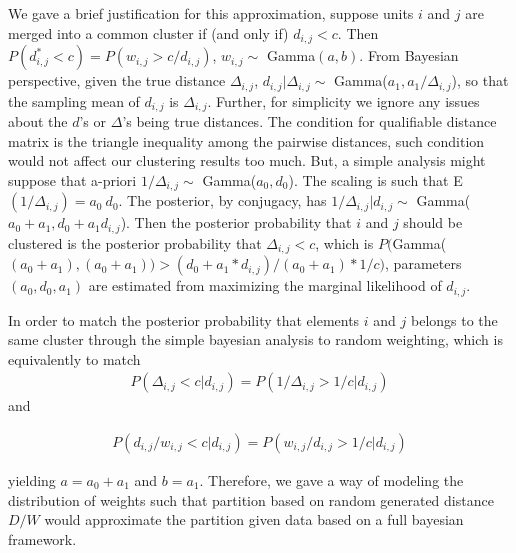 \documentclass[aoas,preprint]{imsart}
\begin{document}
We gave a brief justification for this approximation, suppose units $i$ and $j$ are merged into a common cluster if (and only if) $d_{i,j} < c$. Then $P(d^*_{i,j} < c) = P(w_{i,j} > c / d_{i,j})$, $w_{i,j} \sim$ Gamma$(a, b)$. From Bayesian perspective, given the true distance $\Delta_{i,j}$, $d_{i,j} | \Delta_{i,j} \sim$ Gamma($a_1, a_1 / \Delta_{i,j}$), so that the sampling mean of $d_{i,j}$ is $\Delta_{i,j}$.  Further, for simplicity we ignore any issues about the $d$'s or $\Delta$'s being true distances. The condition for qualifiable distance matrix is the triangle inequality among the pairwise distances, such condition would not affect our clustering results too much. But, a simple analysis might suppose that a-priori $1 / \Delta_{i,j} \sim$ Gamma($a_0, d_0$). The scaling is such that E$(1 / \Delta_{i,j}) = a_0 \ d_0$. The posterior, by conjugacy, has $1 / \Delta_{i,j} | d_{i,j} \sim$ Gamma($a_0 + a_1, d_0 + a_1d_{i,j}$). Then the posterior probability that $i$ and $j$ should be clustered is the posterior probability that $\Delta_{i,j} < c$, which is $P($Gamma($(a_0 + a_1),(a_0 + a_1)) > (d_0 + a_1 * d_{i,j}) / (a_0 + a_1) * 1/c )$, parameters $(a_0, d_0, a_1)$ are estimated from maximizing the marginal likelihood of $d_{i,j}$.

In order to match the posterior probability that elements $i$ and $j$ belongs to the same cluster through the simple bayesian analysis to random weighting, which is equivalently to match 
\begin{eqnarray*} 
P(\Delta_{i,j} < c | d_{i,j}) = P( 1 /  \Delta_{i,j} > 1 / c | d_{i,j})
\end{eqnarray*}
and 

\begin{eqnarray*}
P(d_{i,j} / w_{i,j} < c | d_{i,j}) = P(w_{i,j} / d_{i,j} > 1 / c | d_{i,j})
\end{eqnarray*}

yielding $a = a_0 + a_1$ and $b = a_1$.  Therefore, we gave a way of modeling the distribution of weights such that partition based on random generated distance $D / W$ would approximate the partition given data based on a full bayesian framework.
\end{document}
